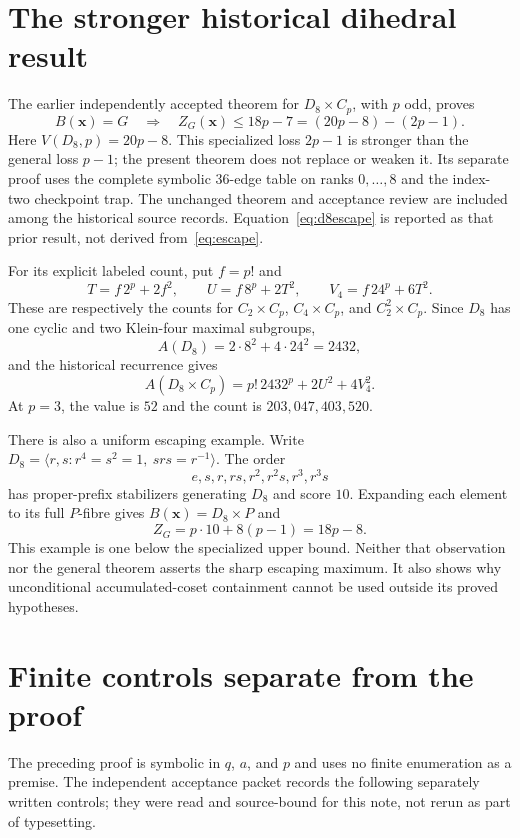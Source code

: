 \documentclass[11pt,letterpaper]{article}
\theoremstyle{definition}
\begin{document}
\section{The stronger historical dihedral result}\label{sec:d8}
The earlier independently accepted theorem for $D_8\times C_p$, with $p$ odd, proves
\begin{equation}
B(\mathbf{x})=G\quad\Longrightarrow\quad
Z_G(\mathbf{x})\le18p-7=(20p-8)-(2p-1).\label{eq:d8escape}
\end{equation}
Here $V(D_8,p)=20p-8$. This specialized loss $2p-1$ is stronger than the general loss $p-1$; the present theorem does not replace or weaken it. Its separate proof uses the complete symbolic 36-edge table on ranks $0,\ldots,8$ and the index-two checkpoint trap. The unchanged theorem and acceptance review are included among the historical source records. Equation~\eqref{eq:d8escape} is reported as that prior result, not derived from~\eqref{eq:escape}.

For its explicit labeled count, put $f=p!$ and
\[
T=f\,2^p+2f^2,\qquad U=f\,8^p+2T^2,\qquad V_4=f\,24^p+6T^2.
\]
These are respectively the counts for $C_2\times C_p$, $C_4\times C_p$, and $C_2^2\times C_p$. Since $D_8$ has one cyclic and two Klein-four maximal subgroups,
\[
A(D_8)=2\cdot8^2+4\cdot24^2=2432,
\]
and the historical recurrence gives
\begin{equation}
A(D_8\times C_p)=p!\,2432^p+2U^2+4V_4^2.\label{eq:d8count}
\end{equation}
At $p=3$, the value is $52$ and the count is $203{,}047{,}403{,}520$.

There is also a uniform escaping example. Write
$D_8=\langle r,s:r^4=s^2=1,\ srs=r^{-1}\rangle$. The order
\[
e,s,r,rs,r^2,r^2s,r^3,r^3s
\]
has proper-prefix stabilizers generating $D_8$ and score $10$. Expanding each element to its full $P$-fibre gives $B(\mathbf{x})=D_8\times P$ and
\[
Z_G=p\cdot10+8(p-1)=18p-8.
\]
This example is one below the specialized upper bound. Neither that observation nor the general theorem asserts the sharp escaping maximum. It also shows why unconditional accumulated-coset containment cannot be used outside its proved hypotheses.

\section{Finite controls separate from the proof}\label{sec:controls}
The preceding proof is symbolic in $q$, $a$, and $p$ and uses no finite enumeration as a premise. The independent acceptance packet records the following separately written controls; they were read and source-bound for this note, not rerun as part of typesetting.
\end{document}
